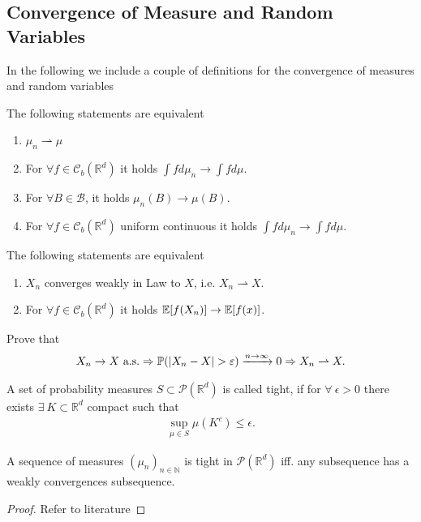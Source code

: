 \subsection{Convergence of Measure and Random Variables}
In the following we include a couple of definitions for the convergence of measures and random variables
\begin{theorem}
 The following statements are equivalent   
 \begin{enumerate}
   \item $\mu_n \rightharpoonup \mu $
   \item For $\forall  f \in  \mathcal{C}_b(\mathbb{R}^{d} )$ it holds $ \int f d\mu_n \to \int  f d\mu$.
\item For $\forall  B \in \mathcal{B} $, it holds $   \mu_n(B) \to  \mu(B)$.
\item For $\forall f \in  \mathcal{C}_b(\mathbb{R}^{d} )$ uniform continuous it holds 
$   \int  f d\mu_n \to  \int f d\mu $.
 \end{enumerate}
\end{theorem}
\begin{theorem}
 The following statements are equivalent  
 \begin{enumerate}
   \item $X_n$ converges weakly in Law to $X$, i.e. $ X_n \rightharpoonup X$.
   \item For $\forall f \in  \mathcal{C}_b(\mathbb{R}^{d} )$ it holds $\mathbb{E}[f(X_n)] \to \mathbb{E}[f(x)]$.
 \end{enumerate}
 \end{theorem}
\begin{exercise}
 Prove that 
 \begin{align*}
   X_n \to  X \ \text{a.s.} \Rightarrow \mathbb{P}(\lvert X_n - X\rvert > \varepsilon ) \xrightarrow{n\to \infty} 0 \Rightarrow X_n \rightharpoonup X
 .\end{align*}
\end{exercise}
\begin{definition}[Tightness]
 A set of probability measures $S \subset  \mathcal{P}(\mathbb{R}^{d} )$  is called tight, if 
 for $\forall \ \epsilon  > 0$ there exists $\exists \  K \subset  \mathbb{R}^{d} $ compact such that 
 \begin{align*}
   \sup_{\mu  \in  S} \mu(K^{c} )  \le  \epsilon 
 .\end{align*}
\end{definition}
\begin{theorem}
  A sequence of measures $(\mu_n)_{n \in  \mathbb{N}}$  is tight in $\mathcal{P}(\mathbb{R}^{d} )$ iff.
  any subsequence has a weakly convergences subsequence.
\end{theorem}
\begin{proof}
 Refer to literature 
\end{proof}
